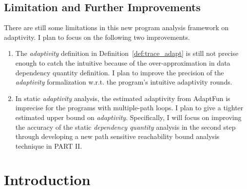 \documentclass[a4paper,11pt]{article}
\newcommand{\THESYSTEM}{\textsf{AdaptFun}}
\begin{document}
\subsection{Limitation and Further Improvements}
\label{sec:adapt-further}
There are still some limitations in this new program analysis framework on adaptivity.
I plan to focus on the following two improvements.
\begin{enumerate}
    \item The \emph{adaptivity} definition in Definition~\ref{def:trace_adapt} is still not precise enough to catch the intuitive
    because of the over-approximation in data dependency quantity definition.
    I plan to improve the precision of the \emph{adaptivity} formalization w.r.t. the program's intuitive adaptivity rounds.
\item In static \emph{adaptivity} analysis, the estimated adaptivity from {\THESYSTEM} is imprecise for the programs with
multiple-path loops.
I plan to give a tighter estimated upper bound on \emph{adaptivity}.
Specifically, I will focus on improving the accuracy of the static \emph{dependency quantity} analysis in the second step through 
developing a new path sensitive reachability bound analysis technique in PART II. 
\end{enumerate}

\section*{}
%

\section{Introduction}
\label{sec:reachability-intro}

\end{document}
